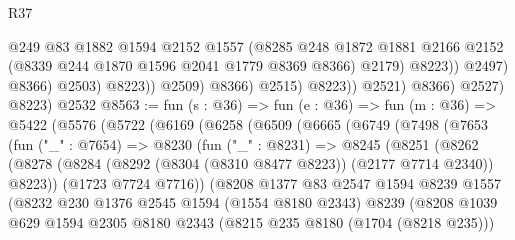 \begin{lexlean}{R37}
\begin{coremodule}
                                    @249
                                    @83
                                    @1882
                                    @1594
                                    @2152
                                    @1557
                                    (@8285
                                      @248
                                      @1872
                                      @1881
                                      @2166
                                      @2152
                                      (@8339 @244 @1870 @1596 @2041 @1779 @8369 @8366)
                                      @2179)
                                    @8223))
                                @2497)
                              @8366)
                            @2503)
                          @8223))
                      @2509)
                    @8366)
                  @2515)
                @8223))
            @2521)
          @8366)
        @2527)
      @8223)
    @2532
@8563 := fun (s : @36) =>
  fun (e : @36) =>
  fun (m : @36) =>
  @5422
    (@5576
      (@5722
        (@6169
          (@6258
            (@6509
              (@6665
                (@6749
                  (@7498
                    (@7653
                      (fun ("_" : @7654) =>
                      @8230
                        (fun ("_" : @8231) =>
                        @8245
                          (@8251
                            (@8262
                              (@8278
                                (@8284
                                  (@8292 (@8304 (@8310 @8477 @8223)) (@2177 @7714 @2340))
                                  @8223))
                              (@1723 @7724 @7716))
                            (@8208
                              @1377
                              @83
                              @2547
                              @1594
                              @8239
                              @1557
                              (@8232
                                @230
                                @1376
                                @2545
                                @1594
                                (@1554 @8180 @2343)
                                @8239
                                (@8208
                                  @1039
                                  @629
                                  @1594
                                  @2305
                                  @8180
                                  @2343
                                  (@8215 @235 @8180 (@1704 (@8218 @235)))

\end{coremodule}
\end{lexlean}
